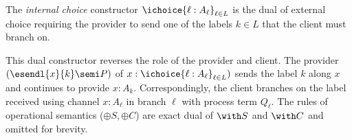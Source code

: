 The \emph{internal choice} constructor
$\ichoice{\ell : A_{\ell}}_{\ell \in L}$ is the dual of external
choice requiring the provider to send one of the labels $k \in L$ that
the client must branch on.
This dual constructor reverses the role of the provider and client.
The provider $(\esendl{x}{k} \semi P)$ of $x : \ichoice{\ell : A_\ell}_{\ell \in L})$
sends the label $k$ along $x$ and continues to provide $x : A_k$.
Correspondingly, the client branches on the label received using channel
$x : A_\ell$ in branch $\ell$ with process term $Q_\ell$.
The rules of operational semantics (${\oplus}S, {\oplus}C$) are exact dual
of ${\with}S$ and ${\with}C$ and omitted for brevity.

